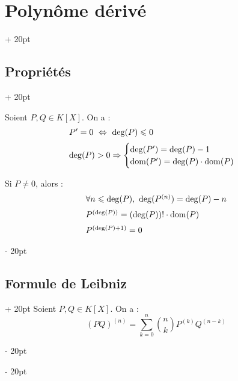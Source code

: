 \documentclass[a4paper, 12pt, twoside]{article}
\newcommand{\ssi}{\ \Leftrightarrow \ }
\newcommand{\eqsys}[2]{\begin{cases} #1 \\ #2 \end{cases}}
\renewcommand{\le}{\leqslant}
\newcommand{\dom}{\mathrm{dom}}
\newcommand{\ind}[1][20pt]{\advance\leftskip + #1}
\newcommand{\deind}[1][20pt]{\advance\leftskip - #1}
\newenvironment{indt}[2][20pt]{#2 \par \ind[#1]}{\par \deind} %
\begin{document}
\begin{indt}{\section{Polynôme dérivé}}
\begin{indt}{\subsection{Propriétés}}
            \vspace{6pt}
            
            Soient $P, Q \in K[X]$. On a :
                \[\begin{array}{l}
                    P' = 0 \ssi \deg(P) \le 0
                    \vspace{6pt}
                    \\
                    \deg(P) > 0 \Rightarrow \eqsys{\deg(P') = \deg(P) - 1}{\dom(P') = \deg(P) \cdot \dom(P)}
                \end{array}\]
            
            Si $P \neq 0$, alors :
                \[\begin{array}{l}
                    \forall n \le \deg(P),\ \deg(P^{(n)}) = \deg(P) - n
                    \vspace{6pt}
                    \\
                    P^{(\deg(P))} = (\deg(P))! \cdot \dom(P)
                    \vspace{6pt}
                    \\
                    P^{(\deg(P) + 1)} = 0
                \end{array}\]
        \end{indt}
        
        \vspace{12pt}
        
        \begin{indt}{\subsection{Formule de Leibniz}}
            Soient $P, Q \in K[X]$. On a :
                \[ (PQ)^{(n)} = \sum_{k = 0}^n \binom{n}{k} P^{(k)} Q^{(n - k)} \]
        \end{indt}
        
    \end{indt}
    
    \vspace{12pt}
    
\end{document}
